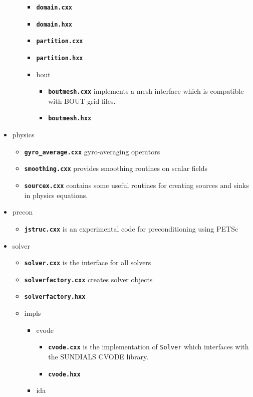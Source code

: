 \documentclass[12pt]{article}
\newcommand{\code}[1]{\texttt{#1}}
\newcommand{\file}[1]{\texttt{\bf #1}}
\begin{document}
\begin{itemize}
\begin{itemize}
    \begin{itemize}
    \item \file{domain.cxx}
    \item \file{domain.hxx}
    \item \file{partition.cxx}
    \item \file{partition.hxx}
    \item bout
      \begin{itemize}
      \item \file{boutmesh.cxx} implements a mesh interface which is compatible
	with BOUT grid files.
      \item \file{boutmesh.hxx}
      \end{itemize}
    \end{itemize}
  \end{itemize}
\item physics
  \begin{itemize}
  \item \file{gyro\_average.cxx} gyro-averaging operators
  \item \file{smoothing.cxx} provides smoothing routines on scalar fields
  \item \file{sourcex.cxx} contains some useful routines for creating
    sources and sinks in physics equations.
  \end{itemize}
\item precon
  \begin{itemize}
  \item \file{jstruc.cxx} is an experimental code for preconditioning using
    PETSc
  \end{itemize}
\item solver
  \begin{itemize}
  \item \file{solver.cxx} is the interface for all solvers 
  \item \file{solverfactory.cxx} creates solver objects
  \item \file{solverfactory.hxx}
  \item impls
    \begin{itemize}
    \item cvode
      \begin{itemize}
      \item \file{cvode.cxx} is the implementation of \code{Solver} which
        interfaces with the SUNDIALS CVODE library.
      \item \file{cvode.hxx}
      \end{itemize}
    \item ida

\end{itemize}
\end{itemize}
\end{itemize}
\end{document}
